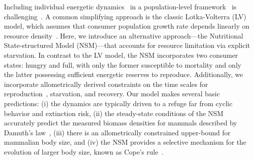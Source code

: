 \documentclass[twocolumn,preprintnumbers,amsmath,amssymb,superscriptaddress]{revtex4}
\begin{document}
\begin{bibunit}[unsrt]
  Including individual energetic dynamics~\citep{Kooi2000} in a
  population-level framework~\citep{Kooi2000,Sousa:2010ez} is
  challenging~\citep{Diekmann:2010da}.  A common simplifying approach is the
  classic Lotka-Volterra (LV) model, which assumes that consumer population
  growth rate depends linearly on resource density~\citep{murdoch:2003}. Here,
  we introduce an alternative approach---the Nutritional State-structured Model
  (NSM)---that accounts for resource limitation via explicit starvation. In
  contrast to the LV model, the NSM incorporates two consumer states: hungry
  and full, with only the former susceptible to mortality and only the latter
  possessing sufficient energetic reserves to reproduce.  Additionally, we
  incorporate allometrically derived constraints on the time scales for
  reproduction~\citep{Kempes:2012hy}, starvation, and recovery.  Our model
  makes several basic predictions: (i) the dynamics are typically driven to a
  refuge far from cyclic behavior and extinction risk, (ii) the steady-state
  conditions of the NSM accurately predict the measured biomass densities for
  mammals described by Damuth's law~\citep{Damuth:1987kr,allen2002,enquist1998,Pedersen:2017he},
  (iii) there is an allometrically constrained upper-bound for mammalian body size, and
  (iv) the NSM provides a selective mechanism for the evolution of larger body size, known as Cope's rule~\citep{Alroy:1998p1594,Clauset:2009fh,Smith:2010p3442,Saarinen:2014br}.




\end{bibunit}
\end{document}
